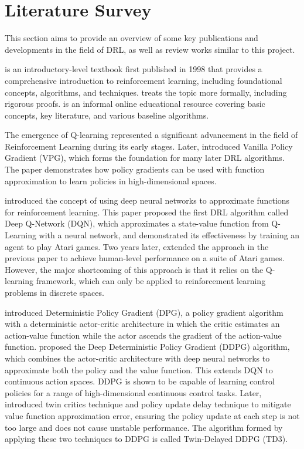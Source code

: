 \section{Literature Survey} \label{sec:literature}

This section aims to provide an overview of some key publications and developments in the field of DRL, as well as review works similar to this project.

\cite{ref:rl-intro} is an introductory-level textbook first published in 1998 that provides a comprehensive introduction to reinforcement learning, including foundational concepts, algorithms, and techniques. \cite{ref:neuro-dp} treats the topic more formally, including rigorous proofs. \cite{ref:spinning-up} is an informal online educational resource covering basic concepts, key literature, and various baseline algorithms.

The emergence of Q-learning \cite{ref:q-learning} represented a significant advancement in the field of Reinforcement Learning during its early stages. Later, \cite{ref:fn-approx} introduced Vanilla Policy Gradient (VPG), which forms the foundation for many later DRL algorithms. The paper demonstrates how policy gradients can be used with function approximation to learn policies in high-dimensional spaces.

\cite{ref:dqn} introduced the concept of using deep neural networks to approximate functions for reinforcement learning. This paper proposed the first DRL algorithm called Deep Q-Network (DQN), which approximates a state-value function from Q-Learning with a neural network, and demonstrated its effectiveness by training an agent to play Atari games. Two years later, \cite{ref:dqn-humanlevel} extended the approach in the previous paper to achieve human-level performance on a suite of Atari games. However, the major shortcoming of this approach is that it relies on the Q-learning framework, which can only be applied to reinforcement learning problems in discrete spaces.

\cite{ref:dpg} introduced Deterministic Policy Gradient (DPG), a policy gradient algorithm with a deterministic actor-critic architecture in which the critic estimates an action-value function while the actor ascends the gradient of the action-value function. \cite{ref:ddpg} proposed the Deep Deterministic Policy Gradient (DDPG) algorithm, which combines the actor-critic architecture with deep neural networks to approximate both the policy and the value function. This extends DQN to continuous action spaces. DDPG is shown to be capable of learning control policies for a range of high-dimensional continuous control tasks. Later, \cite{ref:td3} introduced twin critics technique and policy update delay technique to mitigate value function approximation error, ensuring the policy update at each step is not too large and does not cause unstable performance. The algorithm formed by applying these two techniques to DDPG is called Twin-Delayed DDPG (TD3).

